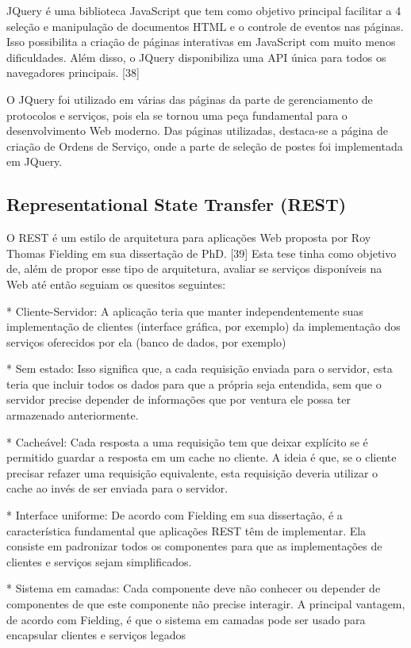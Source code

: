 \documentclass[
	article,			%
	11pt,				%
	oneside,			%
	a4paper,			%
	english,			%
	brazil,				%
	sumario=tradicional
	]{abntex2}
\begin{document}
JQuery é uma biblioteca JavaScript que tem como objetivo principal facilitar a 4
seleção e manipulação de documentos HTML e o controle de eventos nas páginas.
Isso possibilita a criação de páginas interativas em JavaScript com muito menos
dificuldades. Além disso, o JQuery disponibiliza uma API única para todos os
navegadores principais. [38]

O JQuery foi utilizado em várias das páginas da parte de gerenciamento de
protocolos e serviços, pois ela se tornou uma peça fundamental para o
desenvolvimento Web moderno. Das páginas utilizadas, destaca-se a página de
criação de Ordens de Serviço, onde a parte de seleção de postes foi
implementada em JQuery.


\subsection{Representational State Transfer (REST)}

O REST é um estilo de arquitetura para aplicações Web proposta por Roy Thomas
Fielding em sua dissertação de PhD. [39] Esta tese tinha como objetivo de,
além de propor esse tipo de arquitetura, avaliar se serviços disponíveis na Web
até então seguiam os quesitos seguintes:

* Cliente-Servidor: A aplicação teria que manter independentemente suas
implementação de clientes (interface gráfica, por exemplo) da implementação dos
serviços oferecidos por ela (banco de dados, por exemplo)

* Sem estado: Isso significa que, a cada requisição enviada para o servidor,
esta teria que incluir todos os dados para que a própria seja entendida,
sem que o servidor precise depender de informações que por ventura ele possa
ter armazenado anteriormente.

* Cacheável: Cada resposta a uma requisição tem que deixar explícito se é
permitido guardar a resposta em um cache no cliente. A ideia é que, se o
cliente precisar refazer uma requisição equivalente, esta requisição deveria
utilizar o cache ao invés de ser enviada para o servidor.

* Interface uniforme: De acordo com Fielding em sua dissertação, é a
característica fundamental que aplicações REST têm de implementar. Ela
consiste em padronizar todos os componentes para que as implementações de
clientes e serviços sejam simplificados.

* Sistema em camadas: Cada componente deve não conhecer ou depender de
componentes de que este componente não precise interagir. A principal vantagem,
de acordo com Fielding, é que o sistema em camadas pode ser usado para
encapsular clientes e serviços legados
\end{document}
